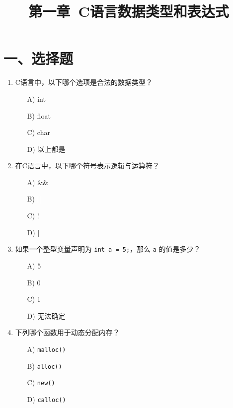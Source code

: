 \documentclass[a4paper,12pt]{article}
\title{\textbf{第一章\ C语言数据类型和表达式}}
\author{}
\date{}
\begin{document}
\maketitle

\section*{一、选择题}

\begin{enumerate}
	\item C语言中，以下哪个选项是合法的数据类型？
	      \begin{enumerate}
		      \item[A)] int
		      \item[B)] float
		      \item[C)] char
		      \item[D)] 以上都是
	      \end{enumerate}
	      \vspace{0.3cm}

	\item 在C语言中，以下哪个符号表示逻辑与运算符？
	      \begin{enumerate}
		      \item[A)] \&\&
		      \item[B)] ||
		      \item[C)] !
		      \item[D)] |
	      \end{enumerate}
	      \vspace{0.3cm}

	\item 如果一个整型变量声明为 \texttt{int a = 5;}，那么 \texttt{a} 的值是多少？
	      \begin{enumerate}
		      \item[A)] 5
		      \item[B)] 0
		      \item[C)] 1
		      \item[D)] 无法确定
	      \end{enumerate}
	      \vspace{0.3cm}

	\item 下列哪个函数用于动态分配内存？
	      \begin{enumerate}
		      \item[A)] \texttt{malloc()}
		      \item[B)] \texttt{alloc()}
		      \item[C)] \texttt{new()}
		      \item[D)] \texttt{calloc()}
	      \end{enumerate}
	      \vspace{0.3cm}


\end{enumerate}
\end{document}
